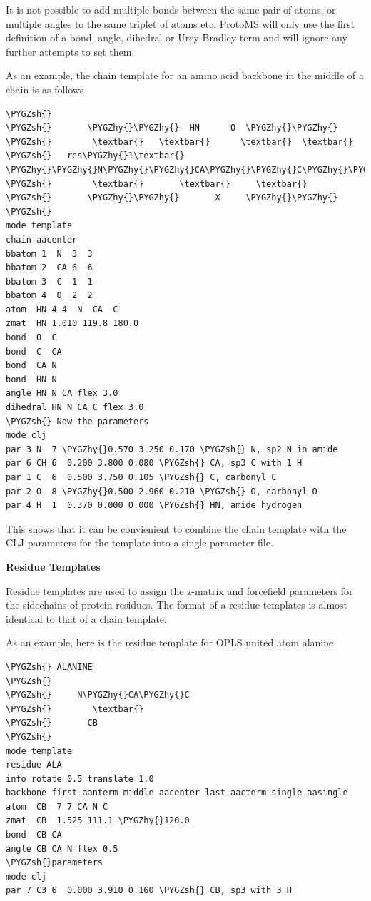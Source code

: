 \documentclass[letterpaper,10pt,english]{sphinxmanual}
\def\PYGZsh{\char`\#}
\def\PYGZhy{\char`\-}
\begin{document}
It is not possible to add multiple bonds between the same pair of atoms, or multiple angles to the same triplet of atoms etc. ProtoMS will only use the first definition of a bond, angle, dihedral or Urey-Bradley term and will ignore any further attempts to set them.

As an example, the chain template for an amino acid backbone in the middle of a chain is as follows

\begin{Verbatim}[commandchars=\\\{\}]
\PYGZsh{}
\PYGZsh{}       \PYGZhy{}\PYGZhy{}  HN      O  \PYGZhy{}\PYGZhy{}
\PYGZsh{}        \textbar{}   \textbar{}      \textbar{}  \textbar{}
\PYGZsh{}   res\PYGZhy{}1\textbar{} \PYGZhy{}\PYGZhy{}N\PYGZhy{}\PYGZhy{}CA\PYGZhy{}\PYGZhy{}C\PYGZhy{}\PYGZhy{}\textbar{}res+1
\PYGZsh{}        \textbar{}       \textbar{}     \textbar{}
\PYGZsh{}       \PYGZhy{}\PYGZhy{}       X     \PYGZhy{}\PYGZhy{}
\PYGZsh{}
mode template
chain aacenter
bbatom 1  N  3  3
bbatom 2  CA 6  6
bbatom 3  C  1  1
bbatom 4  O  2  2
atom  HN 4 4  N  CA  C
zmat  HN 1.010 119.8 180.0
bond  O  C
bond  C  CA
bond  CA N
bond  HN N
angle HN N CA flex 3.0
dihedral HN N CA C flex 3.0
\PYGZsh{} Now the parameters
mode clj
par 3 N  7 \PYGZhy{}0.570 3.250 0.170 \PYGZsh{} N, sp2 N in amide
par 6 CH 6  0.200 3.800 0.080 \PYGZsh{} CA, sp3 C with 1 H
par 1 C  6  0.500 3.750 0.105 \PYGZsh{} C, carbonyl C
par 2 O  8 \PYGZhy{}0.500 2.960 0.210 \PYGZsh{} O, carbonyl O
par 4 H  1  0.370 0.000 0.000 \PYGZsh{} HN, amide hydrogen
\end{Verbatim}

This shows that it can be convienient to combine the chain template with the CLJ parameters for the template into a single parameter file.

\textbf{Residue Templates}

Residue templates are used to assign the z-matrix and forcefield parameters for the sidechains of protein residues. The format of a residue templates is almost identical to that of a chain template.

As an example, here is the residue template for OPLS united atom alanine

\begin{Verbatim}[commandchars=\\\{\}]
\PYGZsh{} ALANINE
\PYGZsh{}
\PYGZsh{}     N\PYGZhy{}CA\PYGZhy{}C
\PYGZsh{}        \textbar{}
\PYGZsh{}       CB
\PYGZsh{}
mode template
residue ALA
info rotate 0.5 translate 1.0
backbone first aanterm middle aacenter last aacterm single aasingle
atom  CB  7 7 CA N C
zmat  CB  1.525 111.1 \PYGZhy{}120.0
bond  CB CA
angle CB CA N flex 0.5
\PYGZsh{}parameters
mode clj
par 7 C3 6  0.000 3.910 0.160 \PYGZsh{} CB, sp3 with 3 H
\end{Verbatim}
\end{document}
